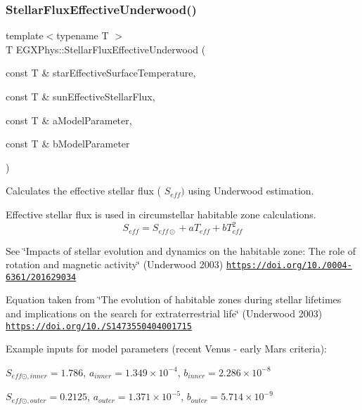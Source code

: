 \subsubsection{\texorpdfstring{Stellar\+Flux\+Effective\+Underwood()}{StellarFluxEffectiveUnderwood()}}
{\footnotesize\ttfamily template$<$typename T $>$ \\
T E\+G\+X\+Phys\+::\+Stellar\+Flux\+Effective\+Underwood (\begin{DoxyParamCaption}\item[{const T \&}]{star\+Effective\+Surface\+Temperature,  }\item[{const T \&}]{sun\+Effective\+Stellar\+Flux,  }\item[{const T \&}]{a\+Model\+Parameter,  }\item[{const T \&}]{b\+Model\+Parameter }\end{DoxyParamCaption})}



Calculates the effective stellar flux ( $S_{eff})$ using Underwood estimation. 

Effective stellar flux is used in circumstellar habitable zone calculations. \[S_{eff}=S_{eff\odot}+aT_{eff}+bT^2_{eff}\]

See \char`\"{}\+Impacts of stellar evolution and dynamics on the habitable zone\+: The role of rotation and magnetic activity\char`\"{} (Underwood 2003) \href{https://doi.org/10.1051/0004-6361/201629034}{\tt https\+://doi.\+org/10./0004-\/6361/201629034}

Equation taken from \char`\"{}\+The evolution of habitable zones during stellar lifetimes and implications on the search for extraterrestrial life\char`\"{} (Underwood 2003) \href{https://doi.org/10.1017/S1473550404001715}{\tt https\+://doi.\+org/10./\+S1473550404001715}

Example inputs for model parameters (recent Venus -\/ early Mars criteria)\+:

$S_{eff\odot,inner} = 1.786$, $a_{inner} = 1.349 \times 10^{-4}$, $b_{inner} = 2.286 \times 10^{-8}$

$S_{eff\odot,outer} = 0.2125$, $a_{outer} = 1.371 \times 10^{-5}$, $b_{outer} = 5.714 \times 10^{-9}$


